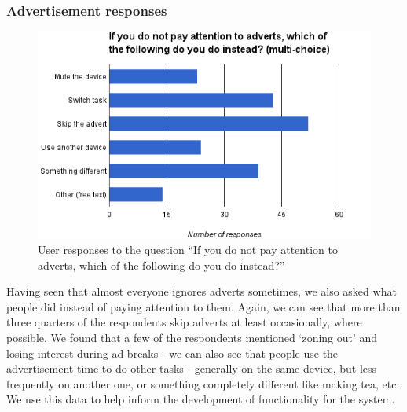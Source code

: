 \subsubsection{Advertisement responses}
\begin{figure}[H]
	\vspace{-10pt}
	\includegraphics[width=\textwidth]{images/prestudy_alternatives.png}
	\caption{User responses to the question ``If you do not pay attention to adverts, which of the following do you do instead?''}
	\label{fig:prestudy_alternatives}
	\vspace{-15pt}
\end{figure}
Having seen that almost everyone ignores adverts sometimes, we also asked what people did instead of paying attention to them. Again, we can see that more than three quarters of the respondents skip adverts at least occasionally, where possible. We found that a few of the respondents mentioned `zoning out' and losing interest during ad breaks - we can also see that people use the advertisement time to do other tasks - generally on the same device, but less frequently on another one, or something completely different like making tea, etc. We use this data to help inform the development of functionality for the system.

